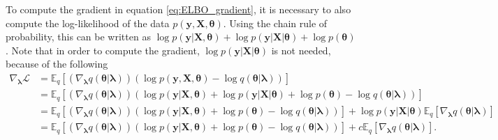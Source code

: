To compute the gradient in equation \eqref{eq:ELBO_gradient}, it is necessary to also compute the log-likelihood of the data $p(\boldsymbol{y}, \boldsymbol{X}, \boldsymbol{\theta})$. Using the chain rule of probability, this can be written as $\log p(\boldsymbol{y} | \boldsymbol{X}, \boldsymbol{\theta}) + \log p(\boldsymbol{y} | \boldsymbol{X} | \boldsymbol{\theta}) + \log p(\boldsymbol{\theta})$. Note that in order to compute the gradient, $\log p(\boldsymbol{y} | \boldsymbol{X} | \boldsymbol{\theta})$ is not needed, because of the following
\begin{equation*}
  \begin{split}
      \nabla_{\boldsymbol{\lambda}} \mathcal{L} &=
      \mathbb{E}_q \left[ \left( \nabla_{\boldsymbol{\lambda}} q(\boldsymbol{\theta} | \boldsymbol{\lambda}) \right) \left( \log p(\boldsymbol{y}, \boldsymbol{X}, \boldsymbol{\theta}) - \log q(\boldsymbol{\theta} | \boldsymbol{\lambda}) \right) \right] \\
      &= \mathbb{E}_q \left[ \left( \nabla_{\boldsymbol{\lambda}} q(\boldsymbol{\theta} | \boldsymbol{\lambda}) \right) \left( \log p(\boldsymbol{y} | \boldsymbol{X}, \boldsymbol{\theta}) + \log p(\boldsymbol{y} | \boldsymbol{X} | \boldsymbol{\theta}) + \log p(\boldsymbol{\theta}) - \log q(\boldsymbol{\theta} | \boldsymbol{\lambda}) \right) \right] \\
      &= \mathbb{E}_q \left[ \left( \nabla_{\boldsymbol{\lambda}} q(\boldsymbol{\theta} | \boldsymbol{\lambda}) \right) \left( \log p(\boldsymbol{y} | \boldsymbol{X}, \boldsymbol{\theta}) + \log p(\boldsymbol{\theta}) - \log q(\boldsymbol{\theta} | \boldsymbol{\lambda}) \right) \right] +  \log p(\boldsymbol{y} | \boldsymbol{X} | \boldsymbol{\theta}) \mathbb{E}_q \left[ \nabla_{\boldsymbol{\lambda}} q(\boldsymbol{\theta} | \boldsymbol{\lambda}) \right] \\
      &= \mathbb{E}_q \left[ \left( \nabla_{\boldsymbol{\lambda}} q(\boldsymbol{\theta} | \boldsymbol{\lambda}) \right) \left( \log p(\boldsymbol{y} | \boldsymbol{X}, \boldsymbol{\theta}) + \log p(\boldsymbol{\theta}) - \log q(\boldsymbol{\theta} | \boldsymbol{\lambda}) \right) \right] +  c \mathbb{E}_q \left[ \nabla_{\boldsymbol{\lambda}} q(\boldsymbol{\theta} | \boldsymbol{\lambda}) \right].
  \end{split}
\end{equation*}

